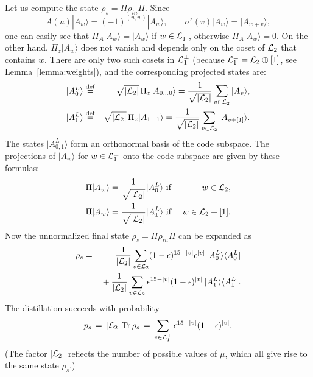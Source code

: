 \documentclass[pra,twocolumn,showpacs]{revtex4}
\newcommand{\calL}{{\cal L }}
\newcommand{\la}{\langle}
\newcommand{\ra}{\rangle}
\newcommand{\bydef}{\stackrel{\mathrm{def}}{=}}
\newcommand{\ep}{\epsilon}
\newcommand{\sz}{\sigma^z}
\newcommand{\nn}{\nonumber}
\DeclareMathOperator*{\tr}{\mathop{\mathrm{Tr}}}
\begin{document}
Let us compute the state $\rho_{s}=\Pi\rho_{in}\Pi$. Since
\[
A(u)|A_w\ra=(-1)^{(u,w)} |A_w\ra, \qquad \sz(v) |A_w\ra = |A_{w+v}\ra,
\]
one can easily see that $\Pi_{A}|A_w\ra=|A_w\ra$ if $w\in\calL_1^\perp$,
otherwise $\Pi_{A}|A_w\ra=0$. On the other hand, $\Pi_{z}|A_w\ra$ does not
vanish and depends only on the coset of $\calL_{2}$ that contains $w$. There
are only two such cosets in $\calL_1^\perp$ (because
$\calL_1^\perp=\calL_2\oplus [1]$, see Lemma~\ref{lemma:weights}), and the
corresponding projected states are:
\begin{eqnarray}\label{A-logical}
|A_0^L\ra &\bydef& \sqrt{|\calL_2|}\,\Pi_{z}|A_{0\ldots 0}\rangle =
\frac1{\sqrt{|\calL_2|}} \sum_{v\in \calL_2} |A_v\ra, \\
|A_1^L\ra &\bydef& \sqrt{|\calL_2|}\,\Pi_{z}|A_{1\ldots 1}\rangle =
\frac1{\sqrt{|\calL_2|}} \sum_{v\in \calL_2} |A_{v+[1]}\ra. \nn
\end{eqnarray}
The states $|A_{0,1}^L\ra$ form an orthonormal basis of the code subspace.
The projections of $|A_w\ra$ for $w\in \calL_1^\perp$ onto the code subspace
are given by these formulas:
\begin{eqnarray}
\Pi |A_w\ra = \frac1{\sqrt{|\calL_2|}} |A_0^L\ra &\text{ if }& 
w\in \calL_2, \nn\\
\Pi |A_w\ra = \frac1{\sqrt{|\calL_2|}} |A_1^L\ra &\text{ if }&
w\in \calL_2 + [1]. \nn
\end{eqnarray}
Now the unnormalized final state $\rho_{s}=\Pi\rho_{in}\Pi$ can be expanded as
\begin{eqnarray}
\rho_{s} &=& 
\frac1{|\calL_2|}\sum_{v\in \calL_2} (1-\ep)^{15-|v|}\ep^{|v|}\, 
|A_0^L\ra\la A_0^L| \nn\\
&& {}+
\frac1{|\calL_2|}\sum_{v\in \calL_2} \ep^{15-|v|}(1-\ep)^{|v|}\,
|A_1^L\ra\la A_1^L|. \nn
\end{eqnarray}
The distillation succeeds with probability
\[
p_{s}\,=\,|\calL_{2}|\tr\rho_{s}\,=\,
\sum_{v\in \calL_1^\perp} \ep^{15-|v|}(1-\ep)^{|v|}.
\]
(The factor $|\calL_{2}|$ reflects the number of possible values of $\mu$,
which all give rise to the same state $\rho_{s}$.)
\end{document}
